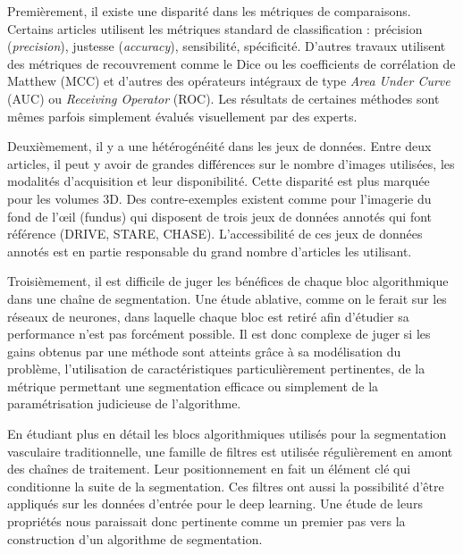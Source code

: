     Premièrement, il existe une disparité dans les métriques de comparaisons. Certains articles utilisent les métriques standard de classification : précision (\textit{precision}), justesse (\textit{accuracy}), sensibilité, spécificité. D'autres travaux utilisent des métriques de recouvrement comme le Dice ou les coefficients de corrélation de Matthew (MCC) et d'autres des opérateurs intégraux de type \textit{Area Under Curve} (AUC) ou \textit{Receiving Operator} (ROC). Les résultats de certaines méthodes sont mêmes parfois simplement évalués visuellement par des experts.

    Deuxièmement, il y a une hétérogénéité dans les jeux de données. Entre deux articles, il peut y avoir de grandes différences sur le nombre d'images utilisées, les modalités d'acquisition et leur disponibilité. Cette disparité est plus marquée pour les volumes 3D. Des contre-exemples existent comme pour l'imagerie du fond de l'œil (fundus) qui disposent de trois jeux de données annotés qui font référence (DRIVE, STARE, CHASE). L'accessibilité de ces jeux de données annotés est en partie responsable du grand nombre d'articles les utilisant.

    Troisièmement, il est difficile de juger les bénéfices de chaque bloc algorithmique dans une chaîne de segmentation. Une étude ablative, comme on le ferait sur les réseaux de neurones, dans laquelle chaque bloc est retiré afin d'étudier sa performance n'est pas forcément possible. Il est donc complexe de juger si les gains obtenus par une méthode sont atteints grâce à sa modélisation du problème, l'utilisation de caractéristiques particulièrement pertinentes, de la métrique permettant une segmentation efficace ou simplement de la paramétrisation judicieuse de l'algorithme.

    En étudiant plus en détail les blocs algorithmiques utilisés pour la segmentation vasculaire traditionnelle, une famille de filtres est utilisée régulièrement en amont des chaînes de traitement. Leur positionnement en fait un élément clé qui conditionne la suite de la segmentation. Ces filtres ont aussi la possibilité d'être appliqués sur les données d'entrée pour le deep learning. Une étude de leurs propriétés nous paraissait donc pertinente comme un premier pas vers la construction d'un algorithme de segmentation.





